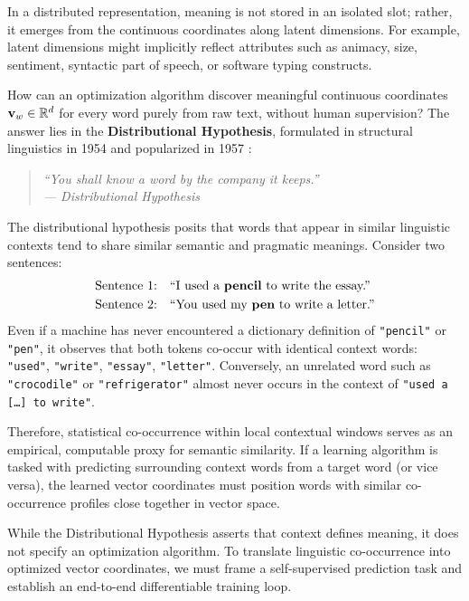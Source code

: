 \documentclass[../../../main.tex]{subfiles}
\begin{document}
In a distributed representation, meaning is not stored in an isolated slot; rather, it emerges from the continuous coordinates along latent dimensions. For example, latent dimensions might implicitly reflect attributes such as animacy, size, sentiment, syntactic part of speech, or software typing constructs.



How can an optimization algorithm discover meaningful continuous coordinates $\mathbf{v}_w \in \mathbb{R}^d$ for every word purely from raw text, without human supervision? The answer lies in the \textbf{Distributional Hypothesis}, formulated in structural linguistics in 1954 \cite{harris1954} and popularized in 1957 \cite{firth1957}:
\begin{quote}
\centering
\itshape
``You shall know a word by the company it keeps.''\\
\upshape\hfill--- Distributional Hypothesis \cite{firth1957}
\end{quote}

The distributional hypothesis posits that words that appear in similar linguistic contexts tend to share similar semantic and pragmatic meanings. Consider two sentences:
\begin{align*}
\text{Sentence 1:} \quad &\text{``I used a \textbf{pencil} to write the essay.''} \\
\text{Sentence 2:} \quad &\text{``You used my \textbf{pen} to write a letter.''}
\end{align*}
Even if a machine has never encountered a dictionary definition of \texttt{"pencil"} or \texttt{"pen"}, it observes that both tokens co-occur with identical context words: \texttt{"used"}, \texttt{"write"}, \texttt{"essay"}, \texttt{"letter"}. Conversely, an unrelated word such as \texttt{"crocodile"} or \texttt{"refrigerator"} almost never occurs in the context of \texttt{"used a [\dots] to write"}.

Therefore, statistical co-occurrence within local contextual windows serves as an empirical, computable proxy for semantic similarity. If a learning algorithm is tasked with predicting surrounding context words from a target word (or vice versa), the learned vector coordinates must position words with similar co-occurrence profiles close together in vector space.

While the Distributional Hypothesis asserts that context defines meaning, it does not specify an optimization algorithm. To translate linguistic co-occurrence into optimized vector coordinates, we must frame a self-supervised prediction task and establish an end-to-end differentiable training loop.
\end{document}

